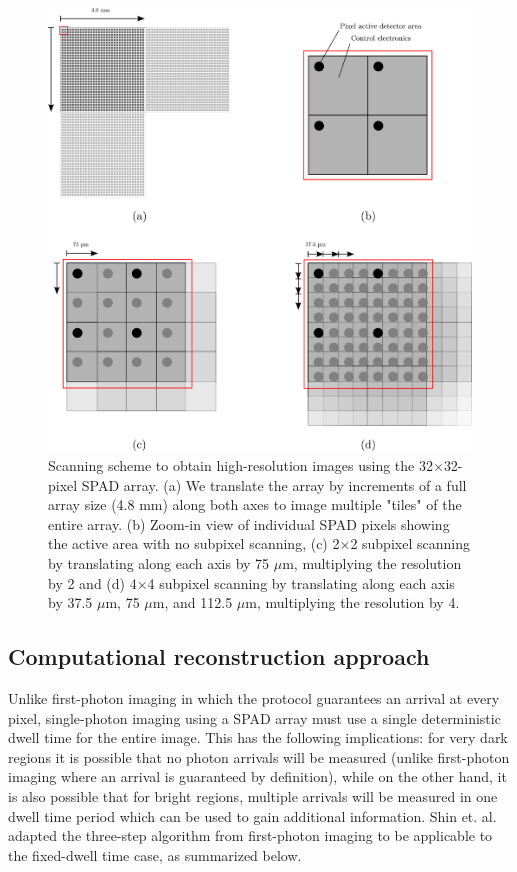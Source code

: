 \begin{figure}[h!]
\centerline{\includegraphics[width=15cm]{figure-first-spad-scanning.pdf}}
\caption{Scanning scheme to obtain high-resolution images using the 32$\times$32-pixel SPAD array. (a) We translate the array by increments of a full array size (4.8 mm) along both axes to image multiple "tiles" of the entire array. (b) Zoom-in view of individual SPAD pixels showing the active area with no subpixel scanning, (c) 2$\times$2 subpixel scanning by translating along each axis by 75 $\mu$m, multiplying the resolution by 2 and (d) 4$\times$4 subpixel scanning by translating along each axis by 37.5 $\mu$m, 75 $\mu$m, and 112.5 $\mu$m, multiplying the resolution by 4.}
\label{figure:first-spad-scanning}
\end{figure}


\subsection{Computational reconstruction approach}

Unlike first-photon imaging in which the protocol guarantees an arrival at every pixel, single-photon imaging using a SPAD array must use a single deterministic dwell time for the entire image. This has the following implications: for very dark regions it is possible that no photon arrivals will be measured (unlike first-photon imaging where an arrival is guaranteed by definition), while on the other hand, it is also possible that for bright regions, multiple arrivals will be measured in one dwell time period which can be used to gain additional information. Shin et. al. \cite{kirmani-photon} adapted the three-step algorithm from first-photon imaging to be applicable to the fixed-dwell time case, as summarized below.


